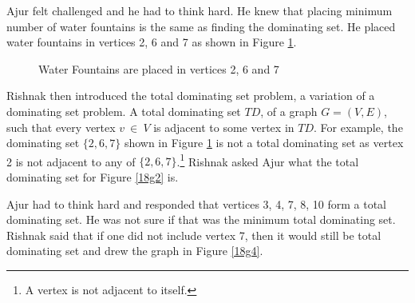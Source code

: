 Ajur felt challenged and he had to think hard. He knew that placing minimum number of water fountains is the same as finding the dominating set. He placed water fountains in vertices 2, 6 and 7 as shown in Figure \ref{18g3}.

\begin{figure}
\begin{center}

\caption{Water Fountains are placed in vertices 2, 6 and 7 }\label{18g3}
\end{center}
\end{figure}

Rishnak then introduced the total dominating set problem, a variation of a dominating set problem. A total dominating set $TD$, of a graph $G=(V,E)$, such that every vertex $v~\in~V$ is adjacent to some vertex in $TD$. For example, the dominating set $\{2,6,7\}$ shown in Figure \ref{18g3} is not a total dominating set as vertex 2 is not adjacent to any of $\{2,6,7\}$.\footnote{A vertex is not adjacent to itself.} Rishnak asked Ajur what the total dominating set for Figure \ref{18g2} is.

Ajur had to think hard and responded that vertices 3, 4, 7, 8, 10 form a total dominating set. He was not sure if that was the minimum total dominating set. Rishnak said that if one did not include vertex 7, then it would still be total dominating set and drew the graph in Figure \ref{18g4}.

